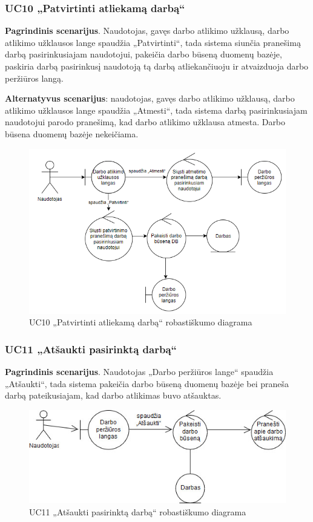 \documentclass{VUMIFPSbakalaurinis}
\begin{document}
\subsubsection{UC10 „Patvirtinti atliekamą darbą“}
\textbf{Pagrindinis scenarijus}. Naudotojas, gavęs darbo atlikimo užklausą, darbo atlikimo užklausos lange spaudžia „Patvirtinti“, tada sistema siunčia pranešimą darbą pasirinkusiajam naudotojui, pakeičia darbo būseną duomenų bazėje, paskiria darbą pasirinkusį naudotoją tą darbą atliekančiuoju ir atvaizduoja darbo peržiūros langą. 
\par \textbf{Alternatyvus scenarijus}: naudotojas, gavęs darbo atlikimo užklausą, darbo atlikimo užklausos lange spaudžia „Atmesti“, tada sistema darbą pasirinkusiajam naudotojui parodo pranešimą, kad darbo atlikimo užklausa atmesta. Darbo būsena duomenų bazėje nekeičiama.

\begin{figure}[H]
	\centering
	\includegraphics[scale=0.6]{img/Robustness/UC10}
	\caption{UC10 „Patvirtinti atliekamą darbą“ robastiškumo diagrama}
	\label{img:uc10rob}
\end{figure}

\subsubsection{UC11 „Atšaukti pasirinktą darbą“}
\textbf{Pagrindinis scenarijus}. Naudotojas „Darbo peržiūros lange“ spaudžia „Atšaukti“, tada sistema pakeičia darbo būseną duomenų bazėje bei praneša darbą pateikusiajam, kad darbo atlikimas buvo atšauktas.

\begin{figure}[H]
	\centering
	\includegraphics[scale=0.6]{img/Robustness/UC11}
	\caption{UC11 „Atšaukti pasirinktą darbą“ robastiškumo diagrama}
	\label{img:uc11rob}
\end{figure}
\end{document}
